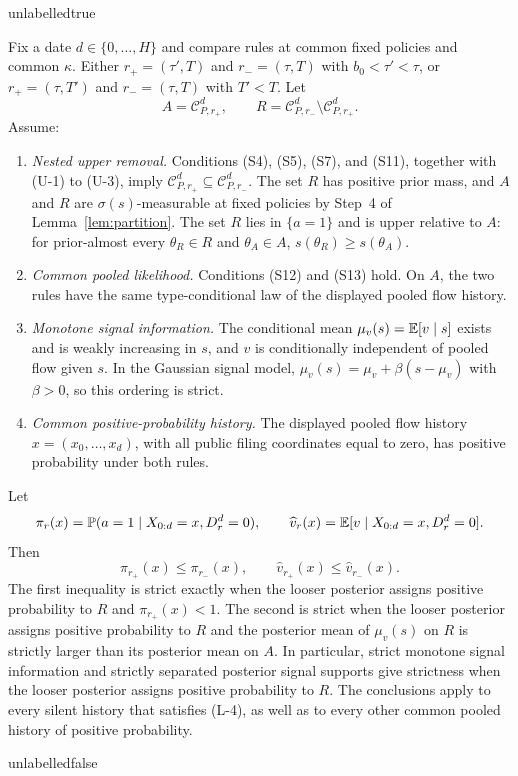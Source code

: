 \csname unlabelledtrue\endcsname
\begin{lemma}[Silence]
\label{lem:silence}
Fix a date $d\in\{0,\ldots,H\}$ and compare rules at common fixed policies and common $\kappa$.
Either $r_+=(\tau',T)$ and $r_-=(\tau,T)$ with $b_0<\tau'<\tau$, or
$r_+=(\tau,T')$ and $r_-=(\tau,T)$ with $T'<T$. Let
\[
  A=\mathcal C_{P,r_+}^{d},
  \qquad
  R=\mathcal C_{P,r_-}^{d}\setminus\mathcal C_{P,r_+}^{d}.
\]
Assume:
\begin{enumerate}[label=(L-\arabic*),leftmargin=3.2em,itemsep=3pt]
\item \emph{Nested upper removal.} Conditions (S4), (S5), (S7), and (S11), together with
  (U-1) to (U-3), imply
  $\mathcal C_{P,r_+}^{d}\subseteq\mathcal C_{P,r_-}^{d}$. The set $R$ has positive prior mass,
  and $A$ and $R$ are $\sigma(s)$-measurable at fixed policies by Step~4 of
  Lemma~\ref{lem:partition}. The set $R$ lies in $\{a=1\}$ and is upper relative to $A$: for
  prior-almost every
  $\theta_R\in R$ and $\theta_A\in A$, $s(\theta_R)\ge s(\theta_A)$.
\item \emph{Common pooled likelihood.} Conditions (S12) and (S13) hold. On $A$, the two rules
  have the same type-conditional law of the displayed pooled flow history.
\item \emph{Monotone signal information.} The conditional mean
  $\mu_v(s)=\mathbb{E}[v\mid s]$ exists and is weakly increasing in $s$, and
  $v$ is conditionally independent of pooled flow given $s$. In the Gaussian signal model,
  $\mu_v(s)=\mu_v+\beta(s-\mu_v)$ with $\beta>0$, so this ordering is strict.
\item \emph{Common positive-probability history.} The displayed pooled flow history
  $x=(x_0,\ldots,x_d)$, with all public filing coordinates equal to zero, has positive
  probability under both rules.
\end{enumerate}
Let
\[
  \pi_r(x)=\mathbb{P}(a=1\mid X_{0:d}=x,D_r^d=0),
  \qquad
  \widehat v_r(x)=\mathbb{E}[v\mid X_{0:d}=x,D_r^d=0].
\]
Then
\begin{equation}
\label{eq:silence-posterior-order}
  \pi_{r_+}(x)\le\pi_{r_-}(x),
  \qquad
  \widehat v_{r_+}(x)\le\widehat v_{r_-}(x).
\end{equation}
The first inequality is strict exactly when the looser posterior assigns positive probability to
$R$ and $\pi_{r_+}(x)<1$. The second is strict when the looser posterior assigns positive
probability to $R$ and the posterior mean of $\mu_v(s)$ on $R$ is strictly larger than its
posterior mean on $A$. In particular, strict monotone signal information and strictly separated
posterior signal supports give strictness when the looser posterior assigns positive probability
to $R$. The conclusions apply to every silent history that satisfies (L-4), as well as to every
other common pooled history of positive probability.
\end{lemma}
\csname unlabelledfalse\endcsname

